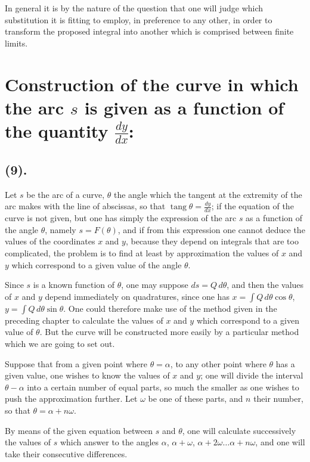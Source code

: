 \documentclass{article}
\begin{document}
In general it is by the nature of the question that one will judge which substitution it is fitting to employ, in preference to any other, in order to transform the proposed integral into another which is comprised between finite limits.

\section*{Construction of the curve in which the arc $s$ is given as a function of the quantity $\frac{dy}{dx}$:}

\subsection*{(9).}

Let $s$ be the arc of a curve, $\theta$ the angle which the tangent at the extremity of the arc makes with the line of abscissas, so that $\operatorname{tang}\theta=\frac{dy}{dx}$; if the equation of the curve is not given, but one has simply the expression of the arc $s$ as a function of the angle $\theta$, namely $s=F(\theta)$, and if from this expression one cannot deduce the values of the coordinates $x$ and $y$, because they depend on integrals that are too complicated, the problem is to find at least by approximation the values of $x$ and $y$ which correspond to a given value of the angle $\theta$.

Since $s$ is a known function of $\theta$, one may suppose $ds=Q\,d\theta$, and then the values of $x$ and $y$ depend immediately on quadratures, since one has $x=\displaystyle\int Q\,d\theta\cos\theta$, $y=\displaystyle\int Q\,d\theta\sin\theta$. One could therefore make use of the method given in the preceding chapter to calculate the values of $x$ and $y$ which correspond to a given value of $\theta$. But the curve will be constructed more easily by a particular method which we are going to set out.

Suppose that from a given point where $\theta=\alpha$, to any other point where $\theta$ has a given value, one wishes to know the values of $x$ and $y$; one will divide the interval $\theta-\alpha$ into a certain number of equal parts, so much the smaller as one wishes to push the approximation further. Let $\omega$ be one of these parts, and $n$ their number, so that $\theta=\alpha+n\omega$.

By means of the given equation between $s$ and $\theta$, one will calculate successively the values of $s$ which answer to the angles $\alpha$, $\alpha+\omega$, $\alpha+2\omega\ldots\alpha+n\omega$, and one will take their consecutive differences.
\end{document}
